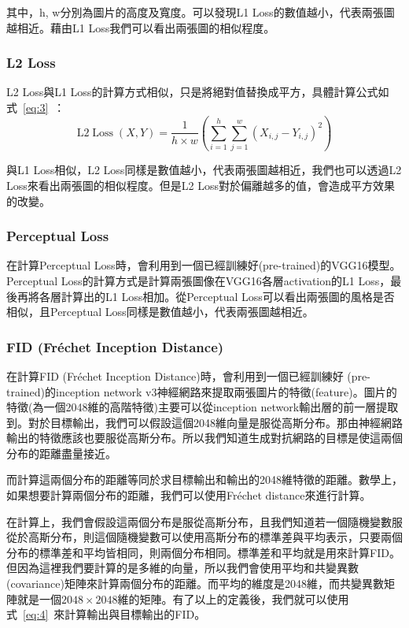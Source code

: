 \documentclass[a4paper, 12pt]{article}
\begin{document}
其中，h, w分別為圖片的高度及寬度。可以發現L1 Loss的數值越小，代表兩張圖越相近。藉由L1 Loss我們可以看出兩張圖的相似程度。

\subsubsection{L2 Loss}
L2 Loss與L1 Loss的計算方式相似，只是將絕對值替換成平方，具體計算公式如式~\ref{eq:3}~：
\begin{equation}
    \mathrm{L} 2 \operatorname{Loss}(X, Y)=\frac{1}{h \times w}\left(\sum_{i=1}^{h} \sum_{j=1}^{w}\left(X_{i, j}-Y_{i, j}\right)^{2}\right)
    \label{eq:3}
\end{equation}

與L1 Loss相似，L2 Loss同樣是數值越小，代表兩張圖越相近，我們也可以透過L2 Loss來看出兩張圖的相似程度。但是L2 Loss對於偏離越多的值，會造成平方效果的改變。

\subsubsection{Perceptual Loss}

在計算Perceptual Loss\cite{zhang2018perceptual}時，會利用到一個已經訓練好(pre-trained)的VGG16模型。Perceptual Loss的計算方式是計算兩張圖像在VGG16各層activation的L1 Loss，最後再將各層計算出的L1 Loss相加。從Perceptual Loss可以看出兩張圖的風格是否相似，且Perceptual Loss同樣是數值越小，代表兩張圖越相近。

\subsubsection{FID (Fréchet Inception Distance)}
在計算FID (Fréchet Inception Distance)\cite{DOWSON1982450}時，會利用到一個已經訓練好 (pre-trained)的inception network v3神經網路來提取兩張圖片的特徵(feature)。圖片的特徵(為一個2048維的高階特徵)主要可以從inception network輸出層的前一層提取到。對於目標輸出，我們可以假設這個2048維向量是服從高斯分布。那由神經網路輸出的特徵應該也要服從高斯分布。所以我們知道生成對抗網路的目標是使這兩個分布的距離盡量接近。

而計算這兩個分布的距離等同於求目標輸出和輸出的2048維特徵的距離。數學上，如果想要計算兩個分布的距離，我們可以使用Fréchet distance來進行計算。

在計算上，我們會假設這兩個分布是服從高斯分布，且我們知道若一個隨機變數服從於高斯分布，則這個隨機變數可以使用高斯分布的標準差與平均表示，只要兩個分布的標準差和平均皆相同，則兩個分布相同。標準差和平均就是用來計算FID。但因為這裡我們要計算的是多維的向量，所以我們會使用平均和共變異數(covariance)矩陣來計算兩個分布的距離。而平均的維度是2048維，而共變異數矩陣就是一個$2048 \times 2048$維的矩陣。有了以上的定義後，我們就可以使用式~\ref{eq:4}~來計算輸出與目標輸出的FID。
\end{document}
